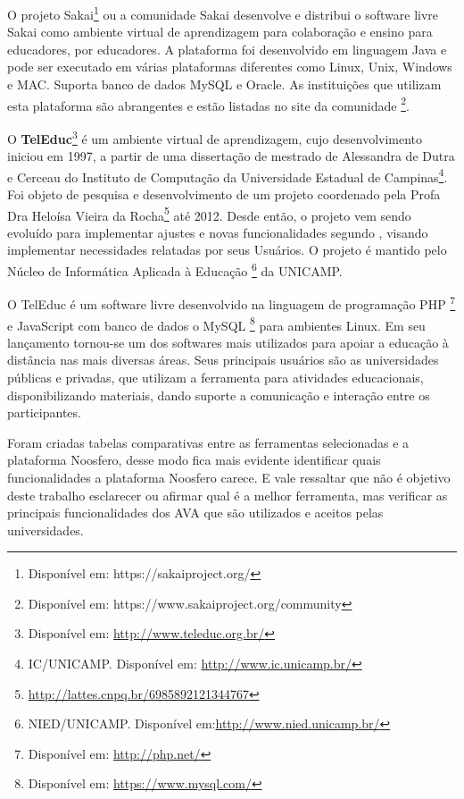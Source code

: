 O projeto Sakai\footnote{Disponível em: https://sakaiproject.org/ } ou a comunidade Sakai desenvolve e distribui o software livre Sakai como ambiente virtual de aprendizagem para colaboração e ensino para educadores, por educadores. A plataforma foi desenvolvido em linguagem Java e pode ser executado em várias plataformas diferentes como Linux, Unix, Windows e MAC. Suporta banco de dados MySQL e Oracle. As instituições que utilizam esta plataforma são abrangentes e estão listadas no site da comunidade \footnote{Disponível em: https://www.sakaiproject.org/community}.

O \textbf{TelEduc}\footnote{Disponível em: \url{http://www.teleduc.org.br/}} é um ambiente virtual de aprendizagem, cujo desenvolvimento iniciou em 1997, a partir de uma dissertação de mestrado de Alessandra de Dutra e Cerceau do Instituto de Computação da Universidade Estadual de Campinas\footnote{IC/UNICAMP. Disponível em: \url{http://www.ic.unicamp.br/}}. Foi objeto de pesquisa e desenvolvimento de um projeto coordenado pela Profa Dra Heloísa Vieira da Rocha\footnote{\url{http://lattes.cnpq.br/6985892121344767}} até 2012. Desde então, o projeto vem sendo evoluído para implementar ajustes e novas funcionalidades segundo \cite{rocha2002ambiente}, visando implementar necessidades relatadas por seus Usuários. O projeto é mantido pelo Núcleo de Informática Aplicada à Educação \footnote{NIED/UNICAMP. Disponível em:\url{http://www.nied.unicamp.br/}} da UNICAMP.

O TelEduc é um software livre desenvolvido na linguagem de programação PHP \footnote{Disponível em: \url{http://php.net/}} e JavaScript com banco de dados o MySQL \footnote{Disponível em: \url{https://www.mysql.com/}} para ambientes Linux. Em seu lançamento tornou-se um dos softwares mais utilizados para apoiar a educação à distância nas mais diversas áreas. Seus principais usuários são as universidades públicas e privadas, que utilizam a ferramenta para atividades educacionais, disponibilizando materiais, dando suporte a comunicação e interação entre os participantes.

Foram criadas tabelas comparativas entre as ferramentas selecionadas e a plataforma Noosfero, desse modo fica mais evidente identificar quais funcionalidades a plataforma Noosfero carece. E vale ressaltar que não é objetivo deste trabalho esclarecer ou afirmar qual é a melhor ferramenta, mas verificar as principais funcionalidades dos AVA que são utilizados e aceitos pelas universidades.

